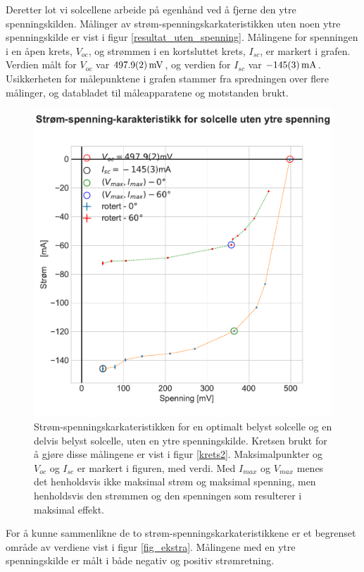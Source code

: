\documentclass[%
 reprint,
 amsmath,amssymb,
 aps,
 norsk,
 booktabs
]{revtex4-1}
\begin{document}
Deretter lot vi solcellene arbeide på egenhånd ved å fjerne den ytre spenningskilden. Målinger av strøm-spenningskarkateristikken uten noen ytre spenningskilde er vist i figur \vref{resultat_uten_spenning}. Målingene for spenningen i en åpen krets, $V_{oc}$, og strømmen i en kortsluttet krets, $I_{sc}$, er markert i grafen. Verdien målt for $V_{oc}$ var $\SI{497.9\pm0.2}{\milli\volt}$, og verdien for $I_{sc}$ var $\SI{-145\pm3}{\milli\ampere}$. Usikkerheten for målepunktene i grafen stammer fra spredningen over flere målinger, og databladet til måleapparatene og motstanden brukt. \\
\begin{figure}
  \centering
  \includegraphics[scale=0.48]{strom_spenning_karr_test.pdf}
  \caption{Strøm-spenningskarkateristikken for en optimalt belyst solcelle og en delvis belyst solcelle, uten en ytre spenningskilde. Kretsen brukt for å gjøre disse målingene er vist i figur \vref{krets2}. Maksimalpunkter og $V_{oc}$ og $I_{sc}$ er markert i figuren, med verdi. Med $I_{max}$ og $V_{max}$ menes det henholdsvis ikke maksimal strøm og maksimal spenning, men henholdsvis den strømmen og den spenningen som resulterer i maksimal effekt.}
  \label{resultat_uten_spenning}
\end{figure}
For å kunne sammenlikne de to strøm-spenningskarkateristikkene er et begrenset område av verdiene vist i figur \vref{fig_ekstra}. Målingene med en ytre spenningskilde er målt i både negativ og positiv strømretning.
\end{document}
